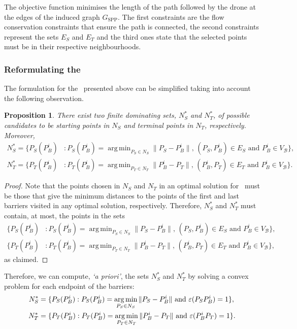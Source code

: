 \documentclass[a4paper,  review, authoryear, 1p., doubleblind]{elsarticle}
\DeclareMathOperator*{\argmin}{arg\,min}
\newcommand{\SPPN}{{\sf{H-SPPN}\xspace }}
\newcommand{\VB}{{V^{}_{\mathcal B}}}
\newcommand{\ES}{{E^{}_{S}}}
\newcommand{\ET}{{E^{}_{T}}}
\newcommand{\GSPP}{{G_{\text{SPP}}}}
\newtheorem{prop}{Proposition}
\begin{document}
	The objective function minimises the length of the path followed by the drone at the edges of the induced graph $\GSPP$. The first constraints are the flow conservation constraints that ensure the path is connected, the second constraints represent the sets $\ES$ and $\ET$ and the third ones state that the selected points must be in their respective neighbourhoods.
	
	
	
	\subsubsection{Reformulating the \SPPN}\label{section:reformulation}
	The formulation for the \SPPN \ presented above can be simplified taking into account the following observation.
	\begin{prop}
		There exist two finite dominating sets, $N_S^*$ and $N_T^*$, of possible candidates to be starting points in $N_S$ and terminal points in $N_T$, respectively. Moreover,
		\begin{align*}
			N^*_S=\{P_S(P_B^i)&:P_S(P_B^i)=\argmin_{P_S\in N_S} \|P_S - P_B^i\|,\,(P_S, P_B^i)\in E_S\text{ and }P_B^i\in\VB\},\\
			N^*_T=\{P_T(P_B^i)&:P_T(P_B^i)=\argmin_{P_T\in N_T} \|P_B^i - P_T\|,\,(P_B^i, P_T)\in E_T\text{ and }P_B^i\in\VB\}.
		\end{align*} 
	\end{prop}
	\begin{proof}
		Note that the points chosen in $N_S$ and $N_T$ in an optimal solution for \SPPN \ must be those that give the minimum distances to the points of the first and last barriers visited in any optimal solution, respectively. Therefore, $N_S^*$ and $N_T^*$ must contain, at most, the points in the sets
		\begin{align*}
			\{P_S(P_B^i)&:P_S(P_B^i)=\argmin_{P_S\in N_S} \|P_S - P_B^i\|,\,(P_S, P_B^i)\in E_S\text{ and }P_B^i\in\VB\},\\
			\{P_T(P_B^i)&:P_T(P_B^i)=\argmin_{P_T\in N_T} \|P_B^i - P_T\|,\,(P_B^i, P_T)\in E_T\text{ and }P_B^i\in\VB\},
		\end{align*} 
		as claimed.
	\end{proof}
	\noindent
	Therefore, we can compute, \textit{`a priori'},  the sets $N_S^*$ and $N_T^*$ by solving a convex problem for each endpoint of the barriers:
	\begin{align*}
		N_S^*&=\{P_S(P_B^i):P_S(P_B^i)=\argmin_{P_S\in N_S} \|P_S - P_B^i\|\text{ and }\varepsilonvar{P_S}{P_B^i}=1\},\\
		N_T^*&=\{P_T(P_B^i):P_T(P_B^i)=\argmin_{P_T\in N_T} \|P_B^i - P_T\|\text{ and }\varepsilonvar{P_B^i}{P_T}=1\}.
	\end{align*}
	
\end{document}

